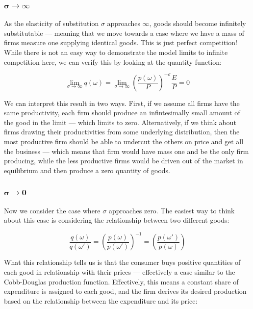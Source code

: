 \documentclass[12pt, letterpaper]{article}
\begin{document}
    \subsubsection{\texorpdfstring{$\bm{\sigma \rightarrow \infty}$}{R\textasciicircum n}}

	As the elasticity of substitution \(\sigma\) approaches \(\infty\), goods should become infinitely substitutable --- meaning that we move towards a case where we have a mass of firms measure one supplying identical goods. This is just perfect competition! While there is not an easy way to demonstrate the model limits to infinite competition here, we can verify this by looking at the quantity function:

	\[ \lim_{\sigma \rightarrow \infty} q(\omega) = \lim_{\sigma \rightarrow \infty} \left(\frac{p(\omega)}{P}\right)^{-\sigma} \frac{E}{P} = 0   \]

	We can interpret this result in two ways. First, if we assume all firms have the same productivity, each firm should produce an infintesimally small amount of the good in the limit --- which limits to zero. Alternatively, if we think about firms drawing their productivities from some underlying distribution, then the most productive firm should be able to undercut the others on price and get all the business --- which means that firm would have mass one and be the only firm producing, while the less productive firms would be driven out of the market in equilibrium and then produce a zero quantity of goods.

	\subsubsection{\texorpdfstring{$\bm{\sigma \rightarrow 0}$}{R\textasciicircum n}}

	Now we consider the case where \(\sigma\) approaches zero. The easiest way to think about this case is considering the relationship between two different goods:

	\[ \frac{q(\omega)}{q(\omega')} = \left(\frac{p(\omega)}{p(\omega')}\right)^{-1} = \left(\frac{p(\omega')}{p(\omega)}\right)    \]

	What this relationship tells us is that the consumer buys positive quantities of each good in relationship with their prices --- effectively a case similar to the Cobb-Douglas production function. Effectively, this means a constant share of expenditure is assigned to each good, and the firm derives its desired production based on the relationship between the expenditure and its price:
\end{document}
